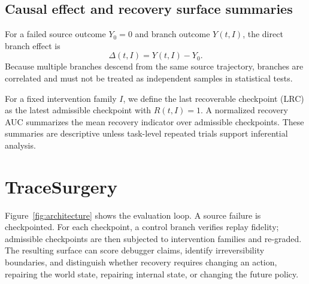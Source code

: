 \documentclass{article}
\begin{document}
\subsection{Causal effect and recovery surface summaries}
For a failed source outcome $Y_0=0$ and branch outcome $Y(t,I)$, the direct branch effect is
\begin{equation}
\Delta(t,I)=Y(t,I)-Y_0.
\end{equation}
Because multiple branches descend from the same source trajectory, branches are correlated and must not be treated as independent samples in statistical tests.

For a fixed intervention family $I$, we define the last recoverable checkpoint (LRC) as the latest admissible checkpoint with $R(t,I)=1$. A normalized recovery AUC summarizes the mean recovery indicator over admissible checkpoints. These summaries are descriptive unless task-level repeated trials support inferential analysis.

\section{TraceSurgery}

Figure~\ref{fig:architecture} shows the evaluation loop. A source failure is checkpointed. For each checkpoint, a control branch verifies replay fidelity; admissible checkpoints are then subjected to intervention families and re-graded. The resulting surface can score debugger claims, identify irreversibility boundaries, and distinguish whether recovery requires changing an action, repairing the world state, repairing internal state, or changing the future policy.
\end{document}
